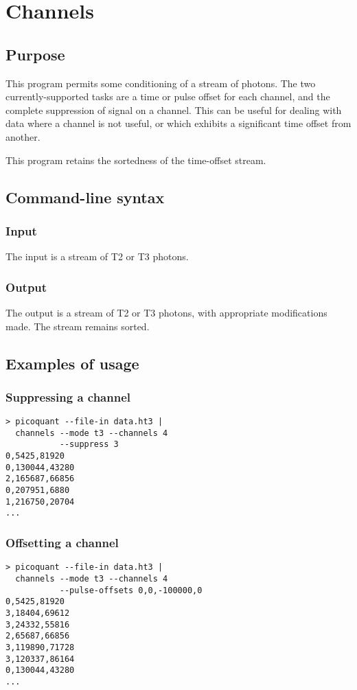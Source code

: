 \section{Channels}
\subsection{Purpose}
This program permits some conditioning of a stream of photons. The two currently-supported tasks are a time or pulse offset for each channel, and the complete suppression of signal on a channel. This can be useful for dealing with data where a channel is not useful, or which exhibits a significant time offset from another.

This program retains the sortedness of the time-offset stream.

\subsection{Command-line syntax}
%

\subsubsection{Input}
The input is a stream of T2 or T3 photons.

\subsubsection{Output}
The output is a stream of T2 or T3 photons, with appropriate modifications made. The stream remains sorted.

\subsection{Examples of usage}
\subsubsection{Suppressing a channel}
\begin{verbatim}
> picoquant --file-in data.ht3 |
  channels --mode t3 --channels 4 
           --suppress 3
0,5425,81920
0,130044,43280
2,165687,66856
0,207951,6880
1,216750,20704
...
\end{verbatim}

\subsubsection{Offsetting a channel}
\begin{verbatim}
> picoquant --file-in data.ht3 |
  channels --mode t3 --channels 4 
           --pulse-offsets 0,0,-100000,0
0,5425,81920
3,18404,69612
3,24332,55816
2,65687,66856
3,119890,71728
3,120337,86164
0,130044,43280
...
\end{verbatim}

